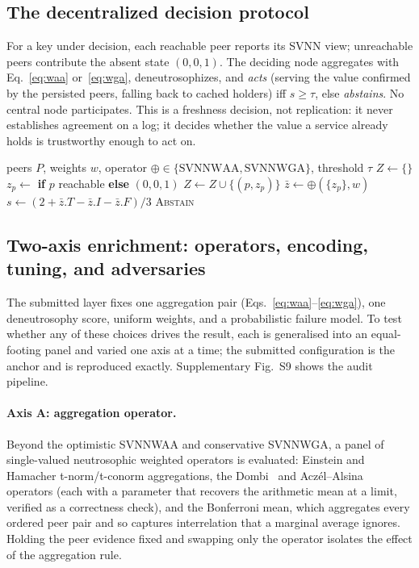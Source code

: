 \documentclass[11pt]{article}
\begin{document}
\subsection{The decentralized decision protocol}
For a key under decision, each reachable peer reports its SVNN view; unreachable peers contribute the
absent state $(0,0,1)$. The deciding node aggregates with Eq.~\eqref{eq:waa} or~\eqref{eq:wga},
deneutrosophizes, and \emph{acts} (serving the value confirmed by the persisted peers, falling back to
cached holders) iff $s\geq\tau$, else \emph{abstains}. No central node participates. This is a
freshness decision, not replication: it never establishes agreement on a log; it decides whether the
value a service already holds is trustworthy enough to act on.

\begin{algorithm}[t]
\caption{Decentralized neutrosophic freshness decision for key $k$}
\label{alg:decide}
\begin{algorithmic}[1]
\Require peers $P$, weights $w$, operator $\oplus\in\{\mathrm{SVNNWAA},\mathrm{SVNNWGA}\}$, threshold $\tau$
\State $Z \gets \{\}$
  \State $z_p \gets$  \textbf{if} $p$ reachable \textbf{else} $(0,0,1)$ 
  \State $Z \gets Z \cup \{(p, z_p)\}$
\EndFor
\State $\bar{z} \gets \oplus(\{z_p\}, w)$ 
\State $s \gets (2 + \bar{z}.T - \bar{z}.I - \bar{z}.F)/3$ 
  \State \Return {}
\Else
  \State \Return \textsc{Abstain}
\EndIf
\end{algorithmic}
\end{algorithm}

\subsection{Two-axis enrichment: operators, encoding, tuning, and adversaries}
\label{sec:enrich}
The submitted layer fixes one aggregation pair (Eqs.~\eqref{eq:waa}--\eqref{eq:wga}), one
deneutrosophy score, uniform weights, and a probabilistic failure model. To test whether any of these
choices drives the result, each is generalised into an equal-footing panel and varied one axis at a
time; the submitted configuration is the anchor and is reproduced exactly. Supplementary Fig.~S9
shows the audit pipeline.

\paragraph{Axis A: aggregation operator.} Beyond the optimistic SVNNWAA and conservative SVNNWGA, a
panel of single-valued neutrosophic weighted operators is evaluated: Einstein and Hamacher
t-norm/t-conorm aggregations, the Dombi~\cite{dombi1982} and Acz\'el--Alsina~\cite{aczel1982}
operators (each with a parameter that recovers the arithmetic mean at a limit, verified as a
correctness check), and the Bonferroni mean, which aggregates every ordered peer pair and so captures
interrelation that a marginal average ignores. Holding the peer evidence fixed and swapping only the
operator isolates the effect of the aggregation rule.
\end{document}

